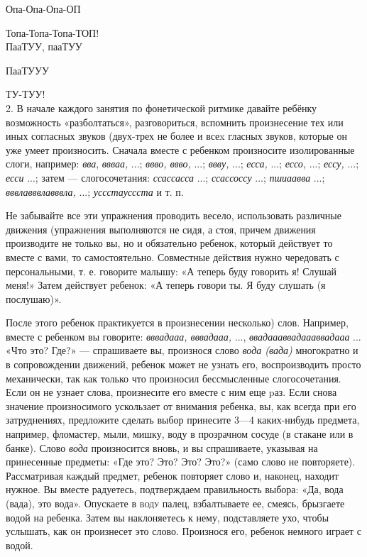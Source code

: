 \documentclass[a5paper]{book}
\renewcommand{\emph}[1]{\textit{#1}}
\begin{document}
Опа-Опа-Опа-ОП

Топа-Топа-Топа-ТОП! \\

ПааТУУ, пааТУУ

ПааТУУУ

ТУ-ТУУ! \\


2. В начале каждого занятия по фонетической ритмике давайте ребёнку
возможность «разболтаться», разговориться, вспомнить произнесение тех
или иных согласных звуков (двух-трех не более и всеx гласных звуков,
которые он уже умеет произносить. Сначала вместе с ребенком произносите
изолированные слоги, например: \emph{вва}, \emph{ввваа,} ...;
\emph{ввво, ввво,} ...; \emph{ввву,} ...; \emph{есса,} ...; \emph{ессо,}
...; \emph{ессу,} ...; \emph{есси} ...; затем --- слогосочетания:
\emph{ссассасса} ...; \emph{ссассоссу} ...; \emph{пшиаавва} ...;
\emph{вввлавввлавввла,} ...; \emph{уссстауссста} и т. п.

Не забывайте все эти упражнения проводить весело, использовать различные
движения (упражнения выполняются не сидя, а стоя, причем движения
производите не только вы, но и обязательно ребенок, который действует то
вместе с вами, то самостоятельно. Совместные действия нужно чередовать с
персональными, т. е. говорите малышу: «А теперь буду говорить я! Слушай
меня!» Затем действует ребенок: «А теперь говори ты. Я буду слушать (я
послушаю)».

После этого ребенок практикуется в произнесении несколько) слов.
Например, вместе с ребенком вы говорите: \emph{вввадааа, вввадааа,} ...,
\emph{ввадаааввадаааввадааа} ... «Что это? Где?» --- спрашиваете вы,
произнося слово \emph{вода (вада)} многократно и в сопровождении
движений, ребенок может не узнать его, воспроизводить просто
механически, так как только что произносил бессмысленные слогосочетания.
Если он не узнает слова, произнесите его вместе с ним еще pаз. Если
снова значение произносимого ускользает от внимания ребенка, вы, как
всегда при его затруднениях, предложите сделать выбор принесите 3---4
каких-нибудь предмета, например, фломастер, мыли, мишку, воду в
прозрачном сосуде (в стакане или в банке). Слово \emph{вода}
произносится вновь, и вы спрашиваете, указывая на принесенные предметы:
«Где это? Это? Это? Это?» (само слово не повторяете). Рассматривая
каждый предмет, ребенок повторяет слово и, наконец, находит нужное. Вы
вместе радуетесь, подтверждаем правильность выбора: «Да, вода (вада),
это вода». Опускаете в \textsc{воду} палец, взбалтываете ее, смеясь,
брызгаете водой на ребенка. Затем вы наклоняетесь к нему, подставляете
ухо, чтобы услышать, как он произнесет это слово. Произнося его, ребенок
немного играет с водой.
\end{document}
